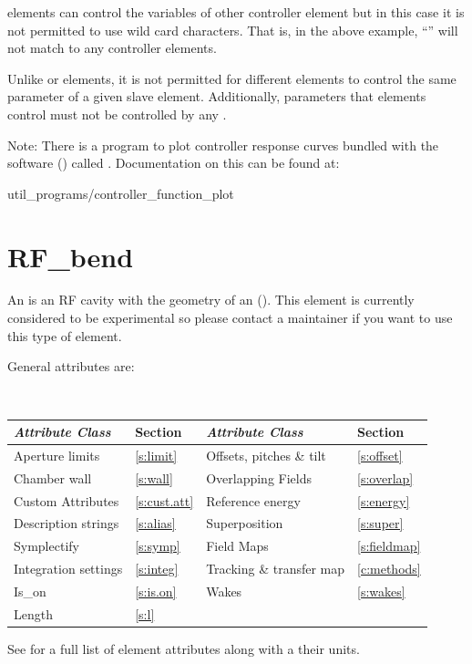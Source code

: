 { elements can control the variables of other controller element but in this case it is
not permitted to use wild card characters. That is, in the above example, ``\vn{*}'' will not match
to any controller elements.

Unlike  or  elements, it is not permitted for different  elements
to control the same parameter of a given slave element. Additionally, parameters that 
elements control must not be controlled by any .

Note: There is a program to plot controller response curves bundled with the \bmad software
() called . Documentation on this can
be found at:
\begin{example}
  util_programs/controller_function_plot
\end{example}

\newpage

\section{RF_bend}
\label{s:rf.bend}

An  is an RF cavity with the geometry of an  (). This element is
currently considered to be experimental so please contact a \bmad maintainer if you want to use this
type of element.

General  attributes are:
\begin{center}
\tt
\begin{tabular}{llll} \toprule
  {\sl Attribute Class}      & Section            & {\sl Attribute Class}      & Section            \\ \midrule
  Aperture limits            & \ref{s:limit}      & Offsets, pitches \& tilt   & \ref{s:offset}     \\
  Chamber wall               & \ref{s:wall}       & Overlapping Fields         & \ref{s:overlap}    \\
  Custom Attributes          & \ref{s:cust.att}   & Reference energy           & \ref{s:energy}     \\ 
  Description strings        & \ref{s:alias}      & Superposition              & \ref{s:super}      \\
  Symplectify                & \ref{s:symp}       & Field Maps                 & \ref{s:fieldmap}   \\
  Integration settings       & \ref{s:integ}      & Tracking \& transfer map   & \ref{c:methods}    \\
  Is_on                      & \ref{s:is.on}      & Wakes                      & \ref{s:wakes}      \\
  Length                     & \ref{s:l}          &                            &                    \\
  \bottomrule
\end{tabular}
\end{center}
\toffset
See  for a full list of element attributes along with a their units.

}
